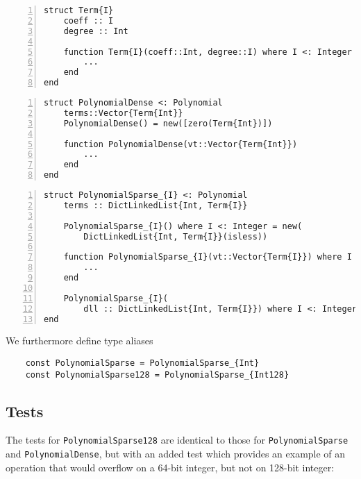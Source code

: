 \documentclass{article}
\theoremstyle{plain}
\numberwithin{theorem}{section}
\numberwithin{example}{section}
\theoremstyle{definition}
\numberwithin{definition}{section}
\begin{document}
\begin{codebox}[term.jl]
    \begin{Verbatim}[numbers=left,xleftmargin=5mm]
struct Term{I}
    coeff :: I
    degree :: Int

    function Term{I}(coeff::Int, degree::I) where I <: Integer
        ...
    end
end
    \end{Verbatim}
\end{codebox}

\begin{codebox}
    \begin{Verbatim}[numbers=left,xleftmargin=5mm]
struct PolynomialDense <: Polynomial
    terms::Vector{Term{Int}}   
    PolynomialDense() = new([zero(Term{Int})])

    function PolynomialDense(vt::Vector{Term{Int}})
        ...
    end
end
    \end{Verbatim}
\end{codebox}

\begin{codebox}
    \begin{Verbatim}[numbers=left,xleftmargin=5mm]
struct PolynomialSparse_{I} <: Polynomial
    terms :: DictLinkedList{Int, Term{I}}

    PolynomialSparse_{I}() where I <: Integer = new(
        DictLinkedList{Int, Term{I}}(isless))

    function PolynomialSparse_{I}(vt::Vector{Term{I}}) where I <: Integer
        ...
    end

    PolynomialSparse_{I}(
        dll :: DictLinkedList{Int, Term{I}}) where I <: Integer = new(dll)
end
    \end{Verbatim}
\end{codebox}

We furthermore define type aliases
\begin{Verbatim}
    const PolynomialSparse = PolynomialSparse_{Int}
    const PolynomialSparse128 = PolynomialSparse_{Int128}
\end{Verbatim}

\bigbreak

\subsection{Tests}
The tests for \texttt{PolynomialSparse128} are identical to those for
\texttt{PolynomialSparse} and \texttt{PolynomialDense}, but with an added test
which provides an example of an operation that would overflow on a 64-bit
integer, but not on 128-bit integer:
\end{document}
